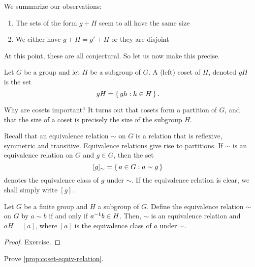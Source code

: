 \documentclass[./main.tex]{subfiles}
\begin{document}
We summarize our observations: 

\begin{enumerate}
    \item The sets of the form $g + H$ seem to all have the same size 
    \item We either have $g+H = g'+H$ or they are disjoint
\end{enumerate}

At this point, these are all conjectural. So let us now make this precise.

\begin{definition}[Coset]
\label{def:coset}
Let $G$ be a group and let $H$ be a subgroup of $G$. A (left) coset of $H$,
denoted $gH$ is the set 
\[
    gH = \set{gh: h \in H}.
\]
\end{definition}

Why are cosets important? It turns out that cosets form a partition of $G$, and
that the size of a coset is precisely the size of the subgroup $H$. 

Recall that an equivalence relation $\sim$ on $G$ is a relation that is
reflexive, symmetric and transitive. Equivalence relations give rise to
partitions. If $\sim$ is an equivalence relation on $G$ and $g \in G$, then the
set 
\[
    [g]_\sim = \set{a \in G: a \sim g}
\]
denotes the equivalence class of $g$ under $\sim$. If the equivalence
relation is clear, we shall simply write $[g]$.
\begin{proposition}
\label{prop:coset-equiv-relation}
    Let $G$ be a finite group and $H$ a subgroup of $G$. Define the equivalence
    relation $\sim$ on $G$ by $a \sim b$ if and only if $a^{-1} b \in H$. Then,
    $\sim$ is an equivalence relation and $aH = [a]$, where $[a]$ is the
    equivalence class of $a$ under $\sim$.
\end{proposition}
\begin{proof}
    Exercise.
\end{proof}
\begin{exercise}
    Prove \cref{prop:coset-equiv-relation}.
\end{exercise}
\end{document}
